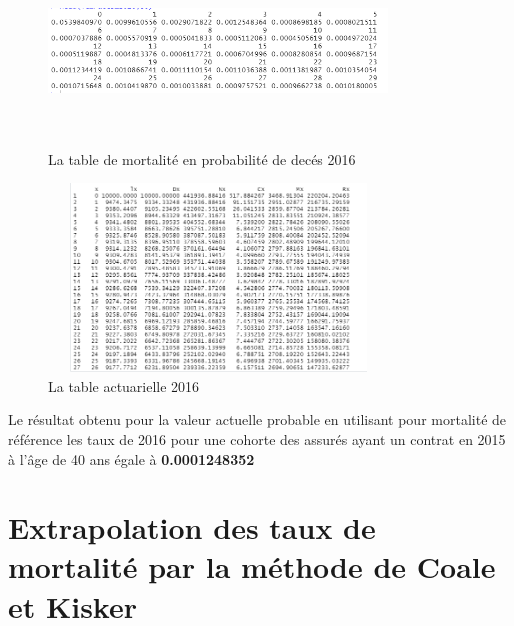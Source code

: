 \documentclass[french]{report}
\begin{document}
\begin{figure}[hhhhhhhh!]
    \centering
    \includegraphics[width=9cm, height=5cm]{mortality_en_proba_de_deces__2016.png}
    \caption{  La table de mortalité en probabilité de decés 2016}
    \label{fig:3.PNG}
\end{figure}
\newline 
\newline 

\begin{figure}[hhhhhhhh!]
    \centering
    \includegraphics[width=9cm, height=5cm]{table_actuarielle_2016.png}
    \caption{  La table actuarielle 2016}
    \label{fig:3.PNG}
\end{figure}
\newline 
\newline 
Le résultat obtenu pour la valeur actuelle probable  en utilisant pour mortalité de référence les taux de 2016  pour une cohorte des assurés ayant un contrat en 2015 à l'âge de 40 ans égale à \textbf{0.0001248352 }







\section{Extrapolation des taux de mortalité par la méthode de Coale et Kisker}
\end{document}
